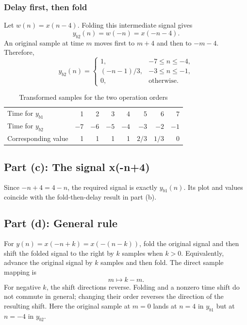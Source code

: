 \subsubsection{Delay first, then fold}
Let $w(n)=x(n-4)$. Folding this intermediate signal gives
\begin{equation}
  y_{b2}(n)=w(-n)=x(-n-4).
\end{equation}
An original sample at time $m$ moves first to $m+4$ and then to
$-m-4$. Therefore,
\begin{equation}
  y_{b2}(n)=\begin{cases}
    1, & -7\leq n\leq-4,\\
    (-n-1)/3, & -3\leq n\leq-1,\\
    0, & \text{otherwise}.
  \end{cases}
\end{equation}
\begin{table}[H]
  \centering
  \caption{Transformed samples for the two operation orders}
  \label{tab:p21-transforms}
  \begin{tabular}{lrrrrrrr}
    \toprule
    Time for $y_{b1}$ & 1 & 2 & 3 & 4 & 5 & 6 & 7\\
    Time for $y_{b2}$ & $-7$ & $-6$ & $-5$ & $-4$ & $-3$ & $-2$ & $-1$\\
    \midrule
    Corresponding value & 1 & 1 & 1 & 1 & $2/3$ & $1/3$ & 0\\
    \bottomrule
  \end{tabular}
\end{table}

\subsection{Part (c): The signal x(-n+4)}
Since $-n+4=4-n$, the required signal is exactly $y_{b1}(n)$.
Its plot and values coincide with the fold-then-delay result in part (b).

\subsection{Part (d): General rule}
For $y(n)=x(-n+k)=x(-(n-k))$, fold the original signal and then shift
the folded signal to the right by $k$ samples when $k>0$.
Equivalently, advance the original signal by $k$ samples and then fold.
The direct sample mapping is
\begin{equation}
  m\longmapsto k-m.
\end{equation}
For negative $k$, the shift directions reverse. Folding and a nonzero
time shift do not commute in general; changing their order reverses
the direction of the resulting shift. Here the original sample at $m=0$
lands at $n=4$ in $y_{b1}$ but at $n=-4$ in $y_{b2}$.

